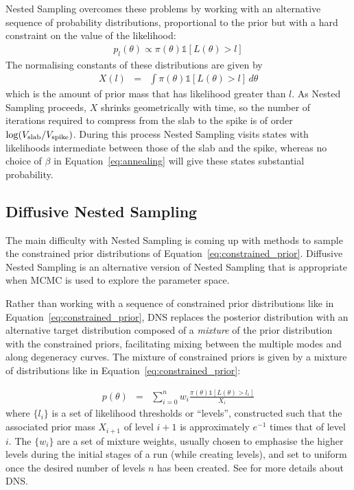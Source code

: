 \documentclass[letterpaper, 11pt]{article}
\begin{document}
Nested Sampling \citep{skilling} overcomes these problems by working with an
alternative sequence of probability distributions, proportional to the prior
but with a hard constraint on the value of the likelihood:
\begin{eqnarray}
p_{l}(\theta) \propto \pi(\theta)\mathds{1}\left[L(\theta) > l\right]\label{eq:constrained_prior}
\end{eqnarray}
The normalising constants of these distributions are given by
\begin{eqnarray}
X(l) &=& \int \pi(\theta)\mathds{1}\left[L(\theta) > l\right] \, d\theta
\end{eqnarray}
which is the amount of prior mass that has likelihood greater than
$l$. As Nested Sampling proceeds, $X$ shrinks geometrically with time, so
the number of iterations required to compress from the slab to the spike is
of order $\log(V_{\rm slab}/V_{\rm spike})$. During this process Nested Sampling
visits states with likelihoods intermediate between those of the slab and the
spike, whereas no choice of $\beta$ in Equation~\ref{eq:annealing} will give
these states substantial probability.

\subsection{Diffusive Nested Sampling}
The main difficulty with Nested Sampling is coming up with methods to sample
the constrained prior distributions of Equation~\ref{eq:constrained_prior}.
Diffusive Nested Sampling
\citep[DNS][]{dnest} is an alternative version of Nested Sampling that is
appropriate when MCMC is used to explore the parameter space.

Rather than working with a sequence of constrained prior distributions like in
Equation~\ref{eq:constrained_prior}, DNS
replaces the posterior distribution with an alternative target
distribution composed of a {\it mixture} of the prior distribution with the
constrained priors, facilitating mixing between the multiple modes
and along degeneracy curves. The mixture of constrained priors is given by
a mixture of distributions like in Equation~\ref{eq:constrained_prior}:

\begin{eqnarray}
p(\theta) &=& \sum_{i=0}^n w_i
\frac{\pi(\theta)\mathds{1}\left[L(\theta) > l_i\right]}{X_i}
\end{eqnarray}
where $\{l_i\}$ is a set of likelihood thresholds or ``levels'',
constructed such that the associated prior mass $X_{i+1}$ of level
$i+1$ is approximately $e^{-1}$ times that of level $i$. The $\{w_i\}$ are a
set of mixture weights, usually chosen to emphasise the higher levels during
the initial stages of a run (while creating levels),
and set to uniform once the desired number of levels $n$ has been created.
See \citet{dnest}
for more details about DNS.
\end{document}
